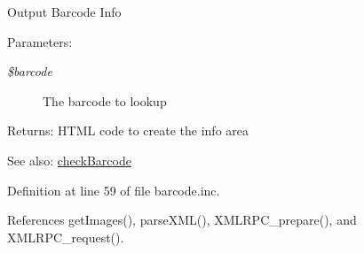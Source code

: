 Output Barcode Info \begin{Desc}
\item[Parameters:]
\begin{description}
\item[{\em \$barcode}]The barcode to lookup \end{description}
\end{Desc}
\begin{Desc}
\item[Returns:]HTML code to create the info area \end{Desc}
\begin{Desc}
\item[See also:]\hyperlink{barcode_8inc_6d3645af0ef526e4f64d28dcbdceb74f}{checkBarcode} \end{Desc}


Definition at line 59 of file barcode.inc.

References getImages(), parseXML(), XMLRPC\_\-prepare(), and XMLRPC\_\-request().

